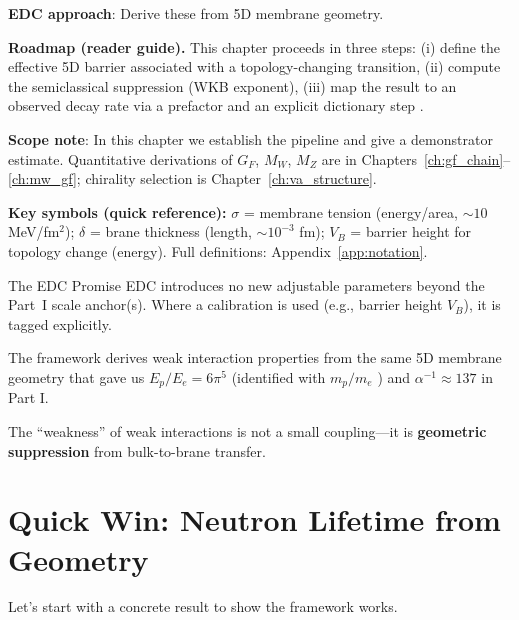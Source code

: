 \textbf{EDC approach}: Derive these from 5D membrane geometry.

\medskip
\noindent\textbf{Roadmap (reader guide).}
This chapter proceeds in three steps:
(i) define the effective 5D barrier associated with a topology-changing transition,
(ii) compute the semiclassical suppression (WKB exponent),
(iii) map the result to an observed decay rate via a prefactor and an explicit dictionary step \tagDc{}.

\textbf{Scope note}: In this chapter we establish the pipeline and give a demonstrator estimate.
Quantitative derivations of $G_F$, $M_W$, $M_Z$ are in Chapters~\ref{ch:gf_chain}--\ref{ch:mw_gf};
chirality selection is Chapter~\ref{ch:va_structure}.

\medskip
\noindent\textbf{Key symbols (quick reference):}
$\sigma$ = membrane tension (energy/area, $\sim 10$ MeV/fm$^2$);
$\delta$ = brane thickness (length, $\sim 10^{-3}$ fm);
$V_B$ = barrier height for topology change (energy).
Full definitions: Appendix~\ref{app:notation}.

\begin{statusbox}{The EDC Promise}
EDC introduces no new adjustable parameters beyond the Part~I scale anchor(s).
Where a calibration is used (e.g., barrier height $V_B$), it is tagged \tagCal{} explicitly.

The framework derives weak interaction properties from the same 5D membrane geometry
that gave us $E_p/E_e = 6\pi^5$ \tagDerSym{} (identified with $m_p/m_e$ \tagDc{})
and $\alpha^{-1} \approx 137$ in Part I.

The ``weakness'' of weak interactions is not a small coupling---it is
\textbf{geometric suppression} from bulk-to-brane transfer.
\end{statusbox}

\section{Quick Win: Neutron Lifetime from Geometry}
\label{sec:quick_win_neutron}

Let's start with a concrete result to show the framework works.

